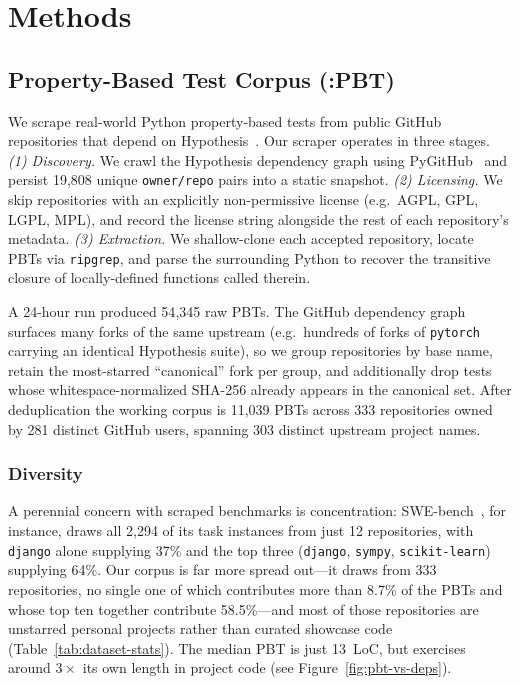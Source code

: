 \section{Methods}


\subsection{Property-Based Test Corpus (\FVSpec:PBT)}

We scrape real-world Python property-based tests from public GitHub repositories that depend on Hypothesis~\cite{maciver2019hypothesis}. Our scraper operates in three stages.
\emph{(1) Discovery.} We crawl the Hypothesis dependency graph using PyGitHub~\cite{pygithub} and persist 19{,}808 unique \texttt{owner/repo} pairs into a static snapshot.
\emph{(2) Licensing.} We skip repositories with an explicitly non-permissive license (e.g.\ AGPL, GPL, LGPL, MPL), and record the license string alongside the rest of each repository's metadata.
\emph{(3) Extraction.} We shallow-clone each accepted repository, locate PBTs via \texttt{ripgrep}, and parse the surrounding Python to recover the transitive closure of locally-defined functions called therein.

A 24-hour run produced 54{,}345 raw PBTs.
The GitHub dependency graph surfaces many forks of the same upstream (e.g.\ hundreds of forks of \texttt{pytorch} carrying an identical Hypothesis suite), so we group repositories by base name, retain the most-starred ``canonical'' fork per group, and additionally drop tests whose whitespace-normalized SHA-256 already appears in the canonical set.
After deduplication the working corpus is 11{,}039 PBTs across 333 repositories owned by 281 distinct GitHub users, spanning 303 distinct upstream project names.

\subsubsection{Diversity}
\label{sec:dataset-diversity}

A perennial concern with scraped benchmarks is concentration: SWE-bench~\cite{jimenez2024swebench}, for instance, draws all 2{,}294 of its task instances from just 12 repositories, with \texttt{django} alone supplying 37\% and the top three (\texttt{django}, \texttt{sympy}, \texttt{scikit-learn}) supplying 64\%. Our corpus is far more spread out---it draws from 333 repositories, no single one of which contributes more than 8.7\% of the PBTs and whose top ten together contribute 58.5\%---and most of those repositories are unstarred personal projects rather than curated showcase code (Table~\ref{tab:dataset-stats}). The median PBT is just 13~LoC, but exercises around $3\times$ its own length in project code (see Figure~\ref{fig:pbt-vs-deps}).

